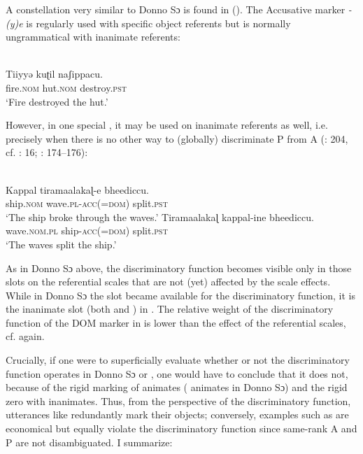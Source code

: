 \documentclass[output=paper]{langsci/langscibook}
\begin{document}
A constellation very similar to Donno Sɔ is found in  (). The Accusative marker \textit{{}-(y)e} is regularly used with  specific object referents but is normally ungrammatical with inanimate referents: 

\ea\label{ex:serzant:10}
\\
\gll Tiiyyǝ       kuʈil   naʃippacu.\\
     fire.\textsc{nom}  hut.\textsc{nom}   destroy.\textsc{pst}\\
\glt ‘Fire destroyed the hut.’
\z

However, in one special , it may be used on inanimate referents as well, i.e. precisely when there is no other way to (globally) discriminate P from A (\citealt{AsherKumari1997}: 204, cf. \citealt{Stiebels2002}: 16; \citealt{Subbārāo2012}: 174\-–176):

\ea\label{ex:serzant:11}
\\
\ea
\gll Kappal   tiramaalakaɭ{}-e   bheediccu.\\
     ship.\textsc{nom}   wave.\textsc{pl-acc(=dom)}  split.\textsc{pst}\\
\glt ‘The ship broke through the waves.’
\ex
\gll Tiramaalakaɭ kappal-ine     bheediccu.\\
     wave.\textsc{nom.pl}     ship-\textsc{acc(=dom)}   split.\textsc{pst}\\
\glt ‘The waves split the ship.’
\z
\z

As in Donno Sɔ above, the discriminatory function becomes visible only in those slots on the referential scales that are not (yet) affected by the scale effects. While in Donno Sɔ the   slot became available for the discriminatory function, it is the inanimate slot (both  and ) in . The relative weight of the discriminatory function of the DOM marker in  is lower than the effect of the referential scales, cf.  again. 

Crucially, if one were to superficially evaluate whether or not the discriminatory function operates in Donno Sɔ or , one would have to conclude that it does not, because of the rigid marking of animates ( animates in Donno Sɔ) and the rigid zero with inanimates. Thus, from the perspective of the discriminatory function, utterances like  redundantly mark their objects; conversely, examples such as  are economical but equally violate the discriminatory function since same-rank A and P are not disambiguated. I summarize:
\end{document}
